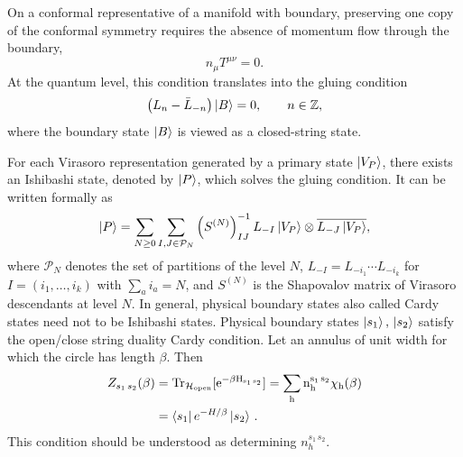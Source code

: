 \documentclass[a4paper]{article}
\begin{document}
On a conformal representative of a manifold with boundary, preserving one copy of the conformal symmetry requires the absence of momentum flow through the boundary,
\begin{equation}
  n_\mu T^{\mu\nu}=0 .
\end{equation}
At the quantum level, this condition translates into the gluing condition
\begin{equation}
  \left(L_n-\bar L_{-n}\right)\ket{B}=0,
  \qquad n\in \mathbb{Z},
\end{equation}
where the boundary state $\ket{B}$ is viewed as a closed-string state.

For each Virasoro representation generated by a primary state $\ket{V_P}$, there exists an Ishibashi state, denoted by $\ket{P}$, which solves the gluing condition. It can be written formally as
\begin{equation}
  \ket{P}
  =
  \sum_{N\geq 0}
  \sum_{I,J\in \mathcal{P}_N}
  \left(S^{(N)}\right)^{-1}_{IJ}
  L_{-I}\ket{V_P}
  \otimes
  \overline{L_{-J}\ket{V_P}} ,
\end{equation}
where $\mathcal{P}_N$ denotes the set of partitions of the level $N$, 
$L_{-I}=L_{-i_1}\cdots L_{-i_k}$ for $I=(i_1,\ldots,i_k)$ with $\sum_a i_a=N$, and $S^{(N)}$ is the Shapovalov matrix of Virasoro descendants at level $N$.
In general, physical boundary states also called Cardy states need not to be Ishibashi states. Physical boundary states $\ket{s_1},\,\ket{s_2}$ satisfy the open/close string duality Cardy condition. Let an annulus of unit width for which the circle has length $\beta$. Then
\begin{equation}
\begin{aligned}
  Z_{s_1\,s_2}(\beta) &= \rm{Tr}_{\mathcal{H}_{\rm open}}[e^{-\beta H_{s_1\,s_2}}] = \sum_{h} n^{s_1\,s_2}_h \chi_h(\beta) \\
                &= \bra{s_1} e^{-H/\beta} \ket{s_2}\,.
\end{aligned}
\end{equation}
This condition should be understood as determining $n_{h}^{s_1\,s_2}$.



\end{document}
